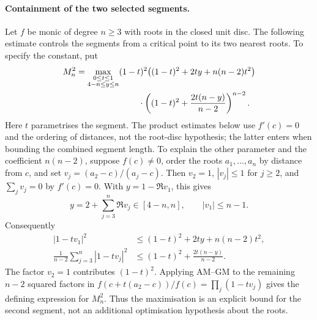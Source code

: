 \documentclass[11pt]{article}
\begin{document}
\paragraph{Containment of the two selected segments.}
Let $f$ be monic of degree $n\ge3$ with roots in the closed unit disc.
The following estimate controls the segments from a critical point to
its two nearest roots. To specify the constant, put
\[
\begin{split}
 M_n^2=\max_{\substack{0\le t\le1\\4-n\le y\le n}}
 &(1-t)^2\bigl((1-t)^2+2ty+n(n-2)t^2\bigr)\\
 &\hspace{8mm}\cdot
 \left((1-t)^2+\frac{2t(n-y)}{n-2}\right)^{n-2}.
\end{split}
\]
Here $t$ parametrises the segment. The product estimates below use
$f'(c)=0$ and the ordering of distances, not the root-disc hypothesis;
the latter enters when bounding the combined segment length. To explain
the other parameter and the coefficient $n(n-2)$, suppose $f(c)\ne0$, order the roots
$a_1,\ldots,a_n$ by distance from $c$, and set
$v_j=(a_2-c)/(a_j-c)$. Then $v_2=1$, $|v_j|\le1$ for $j\ge2$,
and $\sum_jv_j=0$ by $f'(c)=0$. With $y=1-\Re v_1$, this gives
\[
 y=2+\sum_{j=3}^n\Re v_j\in[4-n,n],\qquad |v_1|\le n-1.
\]
Consequently
\[
\begin{split}
 |1-tv_1|^2&\le(1-t)^2+2ty+n(n-2)t^2,\\
 \frac1{n-2}\sum_{j=3}^n|1-tv_j|^2
 &\le(1-t)^2+\frac{2t(n-y)}{n-2}.
\end{split}
\]
The factor $v_2=1$ contributes $(1-t)^2$. Applying AM--GM to the
remaining $n-2$ squared factors in
$f(c+t(a_2-c))/f(c)=\prod_j(1-tv_j)$ gives the defining expression
for $M_n^2$. Thus the maximisation is an explicit bound for the second
segment, not an additional optimisation hypothesis about the roots.
\end{document}
